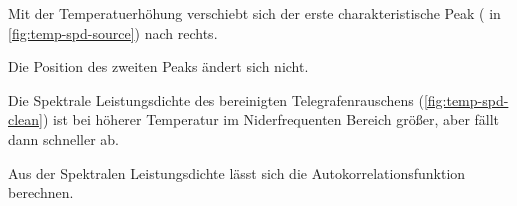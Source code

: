\documentclass[main.tex]{subfiles}
\begin{document}

Mit der Temperatuerhöhung verschiebt sich der  erste charakteristische Peak ( in \cref{fig:temp-spd-source}) nach rechts. 

Die Position des zweiten Peaks ändert sich nicht.


Die Spektrale Leistungsdichte des bereinigten Telegrafenrauschens (\cref{fig:temp-spd-clean}) ist bei höherer Temperatur im Niderfrequenten Bereich größer, aber fällt dann schneller ab.

Aus der Spektralen Leistungsdichte lässt sich die Autokorrelationsfunktion berechnen. 

\begin{figure}[H]
    \centering

\end{figure}
\end{document}
